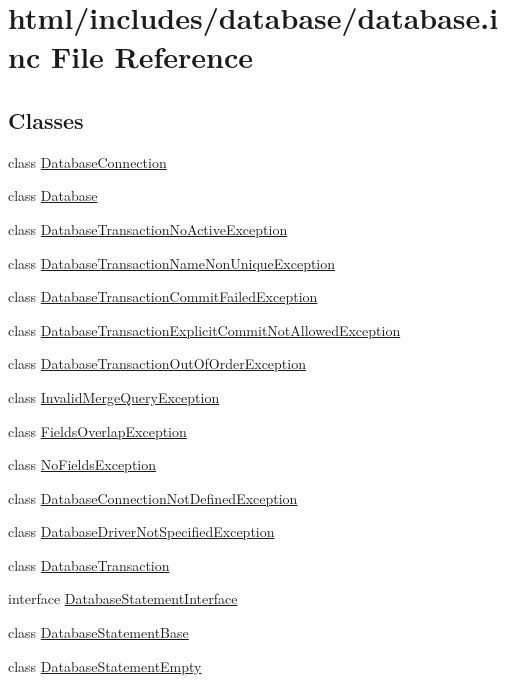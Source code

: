 \hypertarget{database_8inc}{
\section{html/includes/database/database.inc File Reference}
\label{database_8inc}
}
\subsection*{Classes}
\begin{DoxyCompactItemize}
\item 
class \hyperlink{classDatabaseConnection}{DatabaseConnection}
\item 
class \hyperlink{classDatabase}{Database}
\item 
class \hyperlink{classDatabaseTransactionNoActiveException}{DatabaseTransactionNoActiveException}
\item 
class \hyperlink{classDatabaseTransactionNameNonUniqueException}{DatabaseTransactionNameNonUniqueException}
\item 
class \hyperlink{classDatabaseTransactionCommitFailedException}{DatabaseTransactionCommitFailedException}
\item 
class \hyperlink{classDatabaseTransactionExplicitCommitNotAllowedException}{DatabaseTransactionExplicitCommitNotAllowedException}
\item 
class \hyperlink{classDatabaseTransactionOutOfOrderException}{DatabaseTransactionOutOfOrderException}
\item 
class \hyperlink{classInvalidMergeQueryException}{InvalidMergeQueryException}
\item 
class \hyperlink{classFieldsOverlapException}{FieldsOverlapException}
\item 
class \hyperlink{classNoFieldsException}{NoFieldsException}
\item 
class \hyperlink{classDatabaseConnectionNotDefinedException}{DatabaseConnectionNotDefinedException}
\item 
class \hyperlink{classDatabaseDriverNotSpecifiedException}{DatabaseDriverNotSpecifiedException}
\item 
class \hyperlink{classDatabaseTransaction}{DatabaseTransaction}
\item 
interface \hyperlink{interfaceDatabaseStatementInterface}{DatabaseStatementInterface}
\item 
class \hyperlink{classDatabaseStatementBase}{DatabaseStatementBase}
\item 
class \hyperlink{classDatabaseStatementEmpty}{DatabaseStatementEmpty}
\end{DoxyCompactItemize}
